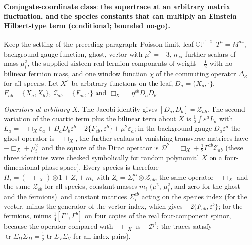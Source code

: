 \paragraph{Conjugate-coordinate class: the supertrace at an arbitrary matrix fluctuation, and the species constants that can multiply an Einstein--Hilbert-type term (conditional; bounded no-go).} \label{detail:sec-F-paragraphconjugatecoordinatecl-36}

Keep the setting of the preceding paragraph: Poisson limit, leaf \(\mathbb{CP}^{1,2}\), \(T^a=M^{a4}\), background gauge function, ghost, vector with \(\mu^2=-3\), \(n_{\mathrm{ex}}\) further scalars of mass \(\mu_i^2\), the supplied sixteen real fermion components of weight \(-\tfrac12\) with no bilinear fermion mass, and one window function \(\chi\) of the commuting operator \(\Delta_\kappa\) for all species. Let \(X^a\) be arbitrary functions on the leaf, \(D_a=\{X_a,\cdot\}\), \(F_{ab}=\{X_a,X_b\}\), \(\mathcal Z_{ab}=\{F_{ab},\cdot\}\) and \(\Box_X=\eta^{ab}D_aD_b\).



\emph{Operators at arbitrary \(X\).} The Jacobi identity gives \([D_a,D_b]=\mathcal Z_{ab}\). The second variation of the quartic term plus the bilinear term about \(X\) is \(\tfrac12\int\varepsilon^aL_a\) with \(L_a=-\Box_X\varepsilon_a+D_aD_b\varepsilon^b-2\{F_{ab},\varepsilon^b\}+\mu^2\varepsilon_a\); in the background gauge \(D_a\varepsilon^a\) the ghost operator is \(-\Box_X\), the further scalars at vanishing transverse matrices have \(-\Box_X+\mu_i^2\), and the square of the Dirac operator is \(\mathcal D^2=\Box_X+\tfrac12\Gamma^{ab}\mathcal Z_{ab}\) (these three identities were checked symbolically for random polynomial \(X\) on a four-dimensional phase space). Every species is therefore \(H_i=(-\Box_X)\otimes1+Z_i+m_i\) with \(Z_i=\Sigma_i^{ab}\otimes\mathcal Z_{ab}\), the same operator \(-\Box_X\) and the same \(\mathcal Z_{ab}\) for all species, constant masses \(m_i\) (\(\mu^2\), \(\mu_i^2\), and zero for the ghost and the fermions), and constant matrices \(\Sigma_i^{ab}\) acting on the species index (for the vector, minus the generator of the vector index, which gives \(-2\{F_{ab},\varepsilon^b\}\); for the fermions, minus \(\tfrac14[\Gamma^a,\Gamma^b]\) on four copies of the real four-component spinor, because the operator compared with \(-\Box_X\) is \(-\mathcal D^2\); the traces satisfy \(\operatorname{tr}\Sigma_D\Sigma_D=\tfrac12\operatorname{tr}\Sigma_V\Sigma_V\) for all index pairs).



